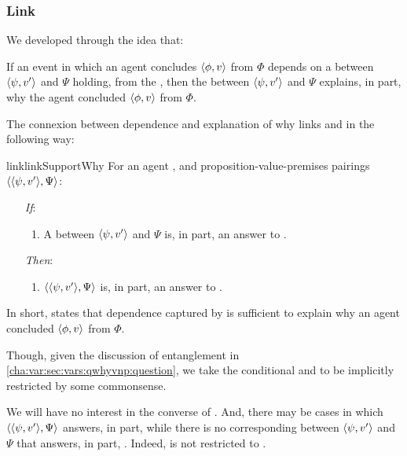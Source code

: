 \subsubsection{Link}
\label{cha:var:sec:vars:qwhyvnp:link}

\begin{note}
  We developed \qWhyV{} through the idea that:

  If an event in which an agent concludes \(\langle \phi, v \rangle\) from \(\Phi\) depends on a  between \(\langle \psi, v' \rangle\) and \(\Psi\) holding, from the \agpe{}, then the  between \(\langle \psi, v' \rangle\) and \(\Psi\) explains, in part, why the agent concluded \(\langle \phi, v \rangle\) from \(\Phi\).

  The connexion between dependence and explanation of why links \qWhyV{} and \qWhy{} in the following way:

  \begin{restatable}{link}{linkSupportWhy}
    \label{link:why:support:pvpp}
    For an agent \vAgent{}, and proposition-value-premises pairings \(\langle \langle \psi, v' \rangle, \Psi \rangle\):

    \begin{itemize}
    \item[\emph{If}:]
      \begin{enumerate}[label=\alph*., ref=(\alph*)]
      \item
        A  between \(\langle \psi, v' \rangle\) and \(\Psi\) is, in part, an answer to \qWhyV{}.
      \end{enumerate}
    \item[\emph{Then}:]
      \begin{enumerate}[label=\alph*., ref=(\alph*), resume]
      \item
        \(\langle \langle \psi, v' \rangle, \Psi \rangle\) is, in part, an answer to \qWhy{}.
      \end{enumerate}
    \end{itemize}
    \vspace{-\baselineskip}
  \end{restatable}

  In short, \linkW{} states that dependence captured by \qWhyV{} is sufficient to explain why an agent concluded \(\langle \phi, v \rangle\) from \(\Phi\).
\end{note}

\begin{note}
  Though, given the discussion of entanglement in \autoref{cha:var:sec:vars:qwhyvnp:question}, we take the conditional and to be implicitly restricted by some commonsense.

  We will have no interest in the converse of \linkW{}.
  And, there may be cases in which \(\langle \langle \psi, v' \rangle, \Psi \rangle\) answers, in part, \qWhy{} while there is no corresponding \ros{} between \(\langle \psi, v' \rangle\) and \(\Psi\) that answers, in part, \qWhyV{}.
  Indeed, \qWhy{} is not restricted to .
\end{note}

